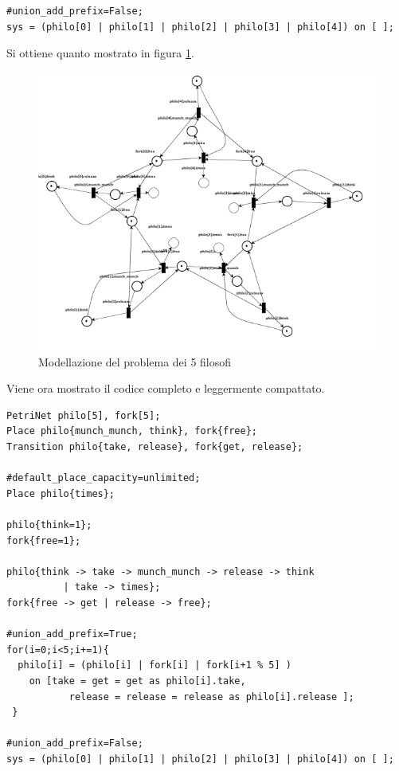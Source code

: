 \documentclass[italian,12pt]{book}
\begin{document}
\begin{verbatim}#union_add_prefix=False;
sys = (philo[0] | philo[1] | philo[2] | philo[3] | philo[4]) on [ ];
\end{verbatim}

Si ottiene quanto mostrato in figura \ref{fig:philosophers.png}.\\

\begin{figure}[htb]
\centerline{\includegraphics[width=12cm]{img/philosophers.png}}
\caption{Modellazione del problema dei 5 filosofi}\label{fig:philosophers.png}
\end{figure}

Viene ora mostrato il codice completo e leggermente compattato.

\begin{verbatim}
PetriNet philo[5], fork[5];
Place philo{munch_munch, think}, fork{free};
Transition philo{take, release}, fork{get, release};

#default_place_capacity=unlimited;
Place philo{times};

philo{think=1};
fork{free=1};

philo{think -> take -> munch_munch -> release -> think 
          | take -> times};
fork{free -> get | release -> free};

#union_add_prefix=True;
for(i=0;i<5;i+=1){
  philo[i] = (philo[i] | fork[i] | fork[i+1 % 5] ) 
  	on [take = get = get as philo[i].take, 
	       release = release = release as philo[i].release ];
 }

#union_add_prefix=False;
sys = (philo[0] | philo[1] | philo[2] | philo[3] | philo[4]) on [ ];
\end{verbatim}

%


\end{document}
